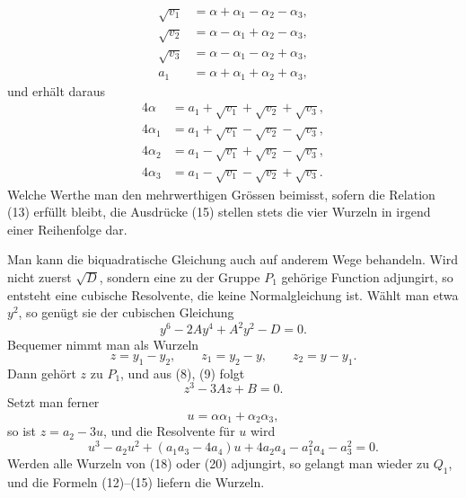 \documentclass[11pt]{article}
\begin{document}
\[
\begin{aligned}
        \sqrt{v_1}&=\alpha+\alpha_1-\alpha_2-\alpha_3,\\
        \sqrt{v_2}&=\alpha-\alpha_1+\alpha_2-\alpha_3,\\
        \sqrt{v_3}&=\alpha-\alpha_1-\alpha_2+\alpha_3,\\
        a_1&=\alpha+\alpha_1+\alpha_2+\alpha_3,
\end{aligned}                                                          \tag{14}
\]
und erhält daraus
\[
\begin{aligned}
4\alpha   &=a_1+\sqrt{v_1}+\sqrt{v_2}+\sqrt{v_3},\\
4\alpha_1 &=a_1+\sqrt{v_1}-\sqrt{v_2}-\sqrt{v_3},\\
4\alpha_2 &=a_1-\sqrt{v_1}+\sqrt{v_2}-\sqrt{v_3},\\
4\alpha_3 &=a_1-\sqrt{v_1}-\sqrt{v_2}+\sqrt{v_3}.
\end{aligned}                                                          \tag{15}
\]
Welche Werthe man den mehrwerthigen Grössen beimisst, sofern die Relation (13) erfüllt bleibt, die Ausdrücke (15) stellen stets die vier Wurzeln in irgend einer Reihenfolge dar.

Man kann die biquadratische Gleichung auch auf anderem Wege behandeln. Wird nicht zuerst $\sqrt D$, sondern eine zu der Gruppe $P_1$ gehörige Function adjungirt, so entsteht eine cubische Resolvente, die keine Normalgleichung ist. Wählt man etwa $y^2$, so genügt sie der cubischen Gleichung
\[
        y^6-2Ay^4+A^2y^2-D=0.                                         \tag{16}
\]
Bequemer nimmt man als Wurzeln
\[
        z=y_1-y_2,
        \qquad z_1=y_2-y,
        \qquad z_2=y-y_1.                                             \tag{17}
\]
Dann gehört $z$ zu $P_1$, und aus (8), (9) folgt
\[
        z^3-3Az+B=0.                                                   \tag{18}
\]
Setzt man ferner
\[
        u=\alpha\alpha_1+\alpha_2\alpha_3,                             \tag{19}
\]
so ist $z=a_2-3u$, und die Resolvente für $u$ wird
\[
        u^3-a_2u^2+(a_1a_3-4a_4)u+4a_2a_4-a_1^2a_4-a_3^2=0.            \tag{20}
\]
Werden alle Wurzeln von (18) oder (20) adjungirt, so gelangt man wieder zu $Q_1$, und die Formeln (12)--(15) liefern die Wurzeln.
\end{document}
